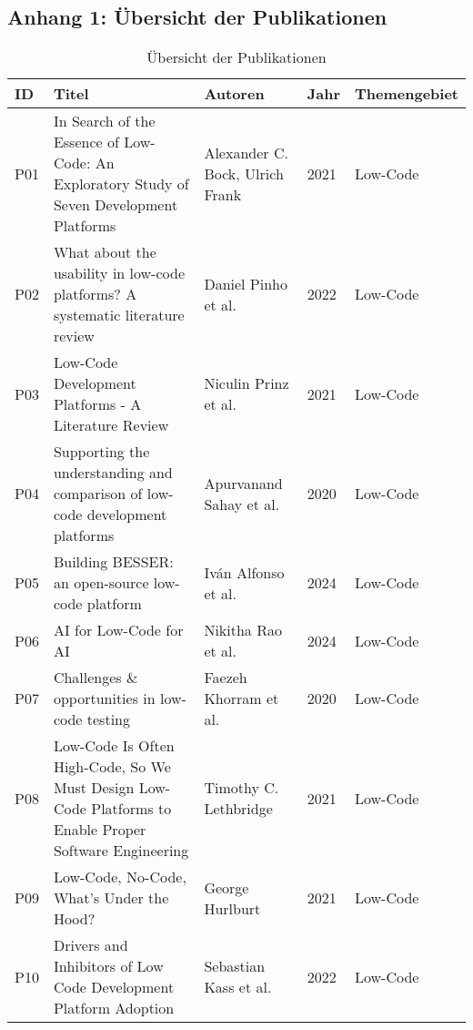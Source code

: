 \subsection*{Anhang 1: Übersicht der Publikationen}

\setcounter{table}{0}
\renewcommand{\thetable}{A\arabic{table}}

\begin{longtable}{|m{0.8cm}|m{4.4cm}|m{3cm}|m{0.8cm}|m{4cm}|}
    \caption{Übersicht der Publikationen} 
    \label{tab:publikationen} \\
    \hline
    \textbf{ID} & \textbf{Titel} & \textbf{Autoren} & \textbf{Jahr} & \textbf{Themengebiet} \\
    \hline
    \endhead
    P01 & In Search of the Essence of Low-Code: An Exploratory Study of Seven Development Platforms & Alexander C. Bock, Ulrich Frank~\cite{Bock_2021_essence} & 2021 & Low-Code  \\ \hline
    P02 & What about the usability in low-code platforms? A systematic literature review & Daniel Pinho et al.~\cite{Pinho_2022} & 2022 & Low-Code  \\ \hline
    P03 & Low-Code Development Platforms - A Literature Review & Niculin Prinz et al.~\cite{Prinz_2021} & 2021 & Low-Code  \\ \hline
    P04 & Supporting the understanding and comparison of low-code development platforms & Apurvanand Sahay et al.~\cite{Sahay_2020} & 2020 & Low-Code  \\ \hline
    P05 & Building BESSER: an open-source low-code platform & Iván Alfonso et al.~\cite{alfonso2024building} & 2024 & Low-Code  \\ \hline
    P06 & AI for Low-Code for AI & Nikitha Rao et al.~\cite{rao2024} & 2024 & Low-Code  \\ \hline
    P07 & Challenges \& opportunities in low-code testing & Faezeh Khorram et al.~\cite{Khorram_2020} & 2020 & Low-Code  \\ \hline
    P08 & Low-Code Is Often High-Code, So We Must Design Low-Code Platforms to Enable Proper Software Engineering & Timothy C. Lethbridge~\cite{lethbridge2021low} & 2021 & Low-Code  \\ \hline
    P09 & Low-Code, No-Code, What's Under the Hood? & George Hurlburt~\cite{Hurlburt_2021} & 2021 & Low-Code  \\ \hline
    P10 & Drivers and Inhibitors of Low Code Development Platform Adoption & Sebastian Kass et al.~\cite{Kass_2022} & 2022 & Low-Code  \\ \hline

\end{longtable}
